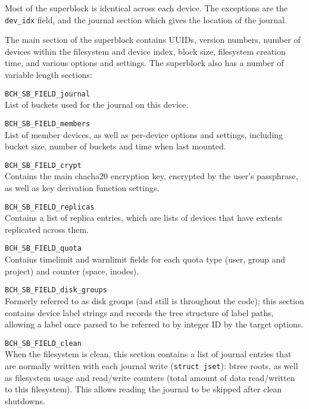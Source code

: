 \documentclass{article}
\begin{document}
Most of the superblock is identical across each device. The exceptions are the
\texttt{dev\_idx} field, and the journal section which gives the location of the
journal.

The main section of the superblock contains UUIDs, version numbers, number of
devices within the filesystem and device index, block size, filesystem creation
time, and various options and settings. The superblock also has a number of
variable length sections:

\begin{description}
	\item \texttt{BCH\_SB\_FIELD\_journal} \\
		List of buckets used for the journal on this device.

	\item \texttt{BCH\_SB\_FIELD\_members} \\
		List of member devices, as well as per-device options and
		settings, including bucket size, number of buckets and time when
		last mounted.

	\item \texttt{BCH\_SB\_FIELD\_crypt} \\
		Contains the main chacha20 encryption key, encrypted by the
		user's passphrase, as well as key derivation function settings.

	\item \texttt{BCH\_SB\_FIELD\_replicas} \\
		Contains a list of replica entries, which are lists of devices
		that have extents replicated across them.

	\item \texttt{BCH\_SB\_FIELD\_quota} \\
		Contains timelimit and warnlimit fields for each quota type
		(user, group and project) and counter (space, inodes).

	\item \texttt{BCH\_SB\_FIELD\_disk\_groups} \\
		Formerly referred to as disk groups (and still is throughout the
		code); this section contains device label strings and records
		the tree structure of label paths, allowing a label once parsed
		to be referred to by integer ID by the target options.

	\item \texttt{BCH\_SB\_FIELD\_clean} \\
		When the filesystem is clean, this section contains a list of
		journal entries that are normally written with each journal
		write (\texttt{struct jset}): btree roots, as well as filesystem
		usage and read/write counters (total amount of data read/written
		to this filesystem). This allows reading the journal to be
		skipped after clean shutdowns.
\end{description}
\end{document}
